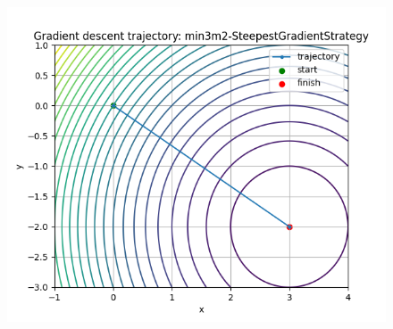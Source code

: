 \documentclass{article}
\begin{document}
\begin{figure}
    \centering
    \includegraphics[width=1\linewidth]{min3m2-SteepestGradientStrategy.png}


\end{figure}
\end{document}

